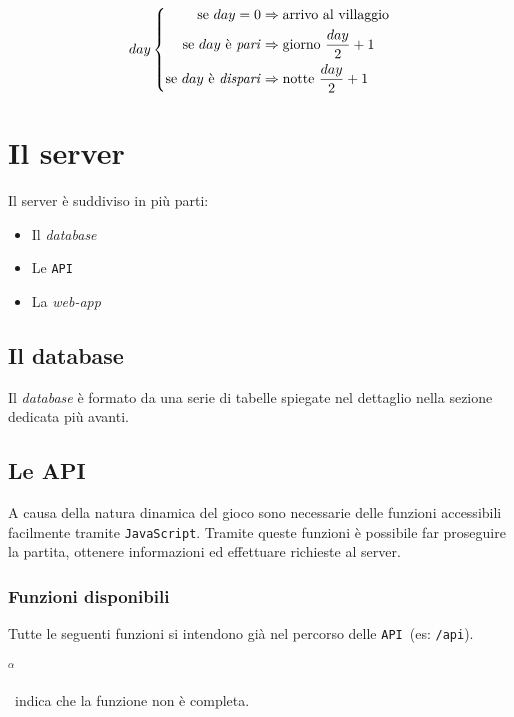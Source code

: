 \documentclass[10pt,a4paper]{article}
\newcommand{\pageurl}[1]{\small\texttt{#1}}
\newcommand{\valpha}{\begin{large}$^\alpha$\end{large}}
\newcommand{\lang}[1]{\texttt{#1}}
\newcommand{\API}{\texttt{API}}
\begin{document}
\[
	day
	\left\{
	\begin{aligned}
	\text{se}\ day = 0 						&\Rightarrow \text{arrivo al villaggio} \\
	\text{se}\ day\ \text{è \emph{pari}}		&\Rightarrow \text{giorno}\ \frac{day}{2}+1 \\
	\text{se}\ day\ \text{è \emph{dispari}}	&\Rightarrow \text{notte}\ \frac{day}{2}+1
	\end{aligned}
	\right.
\]

\section{Il server}
Il server è suddiviso in più parti:
\begin{itemize}
\item Il \emph{database}
\item Le \API
\item La \emph{web-app}
\end{itemize}

\subsection{Il database}
Il \emph{database} è formato da una serie di tabelle spiegate nel dettaglio nella sezione dedicata più avanti.

\subsection{Le API}
A causa della natura dinamica del gioco sono necessarie delle funzioni accessibili facilmente tramite \lang{JavaScript}. Tramite queste funzioni è possibile far proseguire la partita, ottenere informazioni ed effettuare richieste al server.

\subsubsection{Funzioni disponibili}
Tutte le seguenti funzioni si intendono già nel percorso delle \API\ (es: \pageurl{/api}). 

\valpha~indica che la funzione non è completa.
\end{document}
